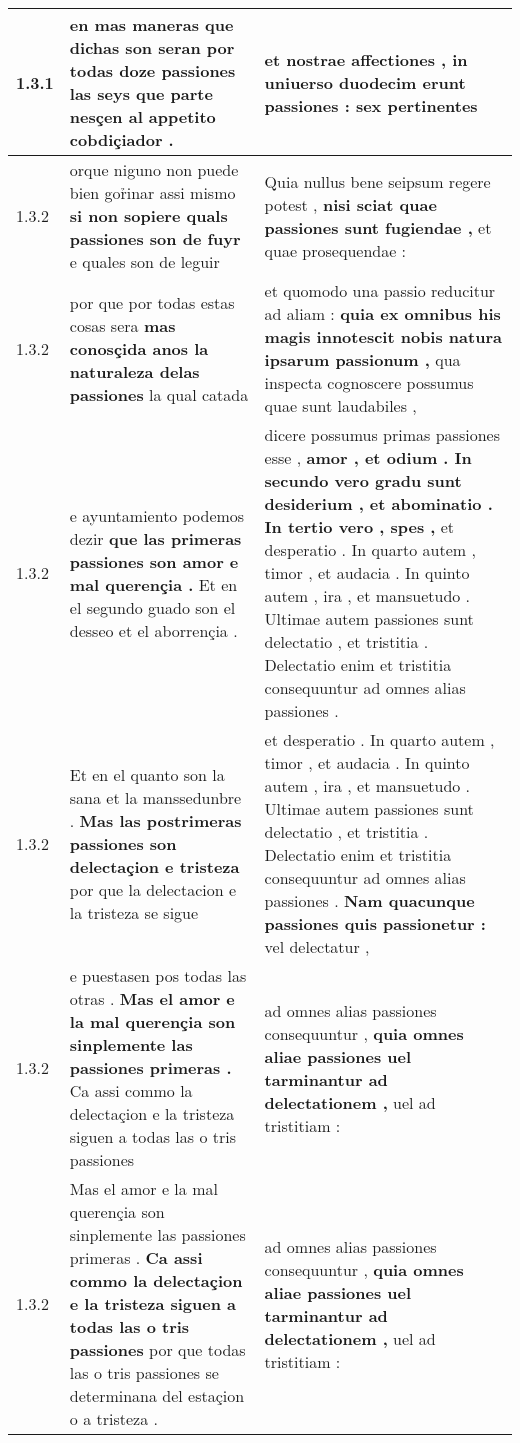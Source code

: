 \begin{tabular}{|p{1cm}|p{6.5cm}|p{6.5cm}|}
1.3.1 & en mas maneras \textbf{ que dichas son seran por todas doze passiones las seys } que parte nesçen al appetito cobdiçiador . & et nostrae affectiones , \textbf{ in uniuerso duodecim erunt passiones : } sex pertinentes \\\hline
1.3.2 & orque niguno non puede bien gor̉inar assi mismo \textbf{ si non sopiere quals passiones son de fuyr } e quales son de leguir & Quia nullus bene seipsum regere potest , \textbf{ nisi sciat quae passiones sunt fugiendae , } et quae prosequendae : \\\hline
1.3.2 & por que por todas estas cosas sera \textbf{ mas conosçida anos la naturaleza delas passiones } la qual catada & et quomodo una passio reducitur ad aliam : \textbf{ quia ex omnibus his magis innotescit nobis natura ipsarum passionum , } qua inspecta cognoscere possumus quae sunt laudabiles , \\\hline
1.3.2 & e ayuntamiento podemos dezir \textbf{ que las primeras passiones son amor e mal querençia . } Et en el segundo guado son el desseo et el aborrençia . & dicere possumus primas passiones esse , \textbf{ amor , et odium . In secundo vero gradu sunt desiderium , et abominatio . In tertio vero , spes , } et desperatio . In quarto autem , timor , et audacia . In quinto autem , ira , et mansuetudo . Ultimae autem passiones sunt delectatio , et tristitia . Delectatio enim et tristitia consequuntur ad omnes alias passiones . \\\hline
1.3.2 & Et en el quanto son la sana et la manssedunbre . \textbf{ Mas las postrimeras passiones son delectaçion e tristeza } por que la delectacion e la tristeza se sigue & et desperatio . In quarto autem , timor , et audacia . In quinto autem , ira , et mansuetudo . Ultimae autem passiones sunt delectatio , et tristitia . Delectatio enim et tristitia consequuntur ad omnes alias passiones . \textbf{ Nam quacunque passiones quis passionetur : } vel delectatur , \\\hline
1.3.2 & e puestasen pos todas las otras . \textbf{ Mas el amor e la mal querençia son sinplemente las passiones primeras . } Ca assi commo la delectaçion e la tristeza siguen a todas las o tris passiones & ad omnes alias passiones consequuntur , \textbf{ quia omnes aliae passiones uel tarminantur ad delectationem , } uel ad tristitiam : \\\hline
1.3.2 & Mas el amor e la mal querençia son sinplemente las passiones primeras . \textbf{ Ca assi commo la delectaçion e la tristeza siguen a todas las o tris passiones } por que todas las o tris passiones se determinana del estaçion o a tristeza . & ad omnes alias passiones consequuntur , \textbf{ quia omnes aliae passiones uel tarminantur ad delectationem , } uel ad tristitiam : \\\hline

\end{tabular}
